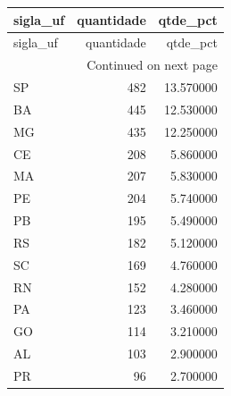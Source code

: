 \begin{longtable}{lrr}
\toprule
sigla_uf & quantidade & qtde_pct \\
\midrule
\endfirsthead
\toprule
sigla_uf & quantidade & qtde_pct \\
\midrule
\endhead
\midrule
\multicolumn{3}{r}{Continued on next page} \\
\midrule
\endfoot
\bottomrule
\endlastfoot
SP & 482 & 13.570000 \\
BA & 445 & 12.530000 \\
MG & 435 & 12.250000 \\
CE & 208 & 5.860000 \\
MA & 207 & 5.830000 \\
PE & 204 & 5.740000 \\
PB & 195 & 5.490000 \\
RS & 182 & 5.120000 \\
SC & 169 & 4.760000 \\
RN & 152 & 4.280000 \\
PA & 123 & 3.460000 \\
GO & 114 & 3.210000 \\
AL & 103 & 2.900000 \\
PR & 96 & 2.700000 \\
\end{longtable}
